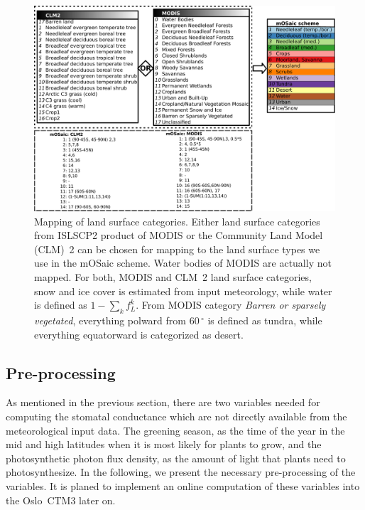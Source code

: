 \documentclass[gmd, manuscript]{copernicus}
\begin{document}
\begin{figure}[t]
  \includegraphics[width=12cm]{fig02}
  \caption{Mapping of land surface categories. Either land surface categories from ISLSCP2 product of MODIS or the Community Land Model (CLM)~2 can be chosen for mapping to the land surface types we use in the mOSaic scheme. Water bodies of MODIS are actually not mapped. For both, MODIS and CLM~2 land surface categories, snow and ice cover is estimated from input meteorology, while water is defined as $1-\sum_{k} f_L^k$. From MODIS category \emph{Barren or sparsely vegetated}, everything polward from $60\,\unit{^\circ}$ is defined as tundra, while everything equatorward is categorized as desert.}
  \label{fig:pft_mapping}
\end{figure}
%
\subsection{Pre-processing}
\label{subsec:pre-pro}
As mentioned in the previous section, there are two variables needed for computing the stomatal conductance which are not directly available from the meteorological input data. The greening season, as the time of the year in the mid and high latitudes when it is most likely for plants to grow, and the photosynthetic photon flux density, as the amount of light that plants need to photosynthesize. In the following, we present the necessary pre-processing of the variables. It is planed to implement an online computation of these variables into the Oslo~CTM3 later on.
\end{document}
